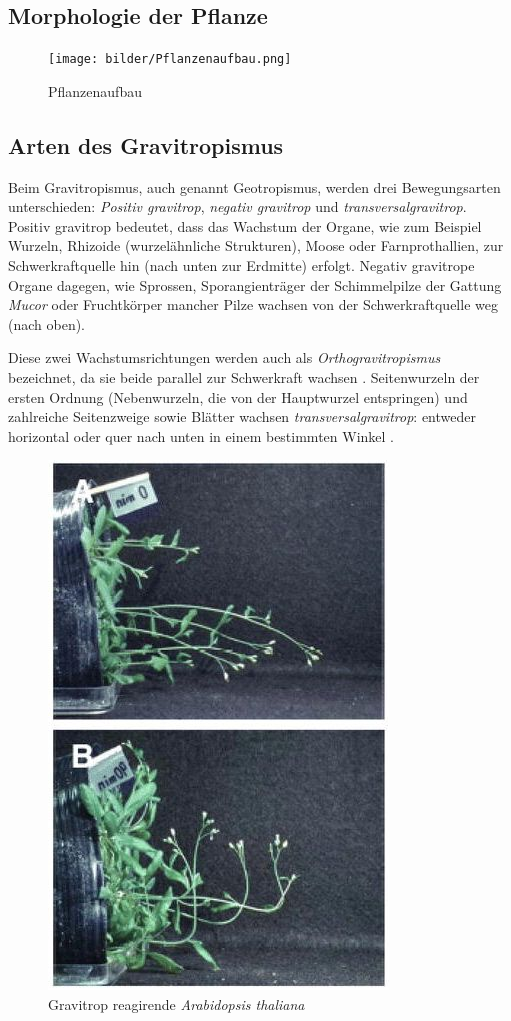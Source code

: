\documentclass[
a4paper, 
11pt, 
ngerman,
listof=totoc,
bibliography=totocnumbered,
abstracton
]{scrreprt}
\begin{document}
\subsection{Morphologie der Pflanze}

\begin{figure}[H]
	\centering 
	\texttt{[image: bilder/Pflanzenaufbau.png]}
	\caption{Pflanzenaufbau  \label{Pflanzenaufbau}}
\end{figure} 


\subsection{Arten des Gravitropismus}
Beim Gravitropismus, auch genannt Geotropismus, werden drei Bewegungsarten unterschieden: \emph{Positiv gravitrop},  \emph{negativ gravitrop} und  \emph{transversalgravitrop}.
Positiv gravitrop bedeutet, dass das Wachstum der Organe, wie zum Beispiel Wurzeln, Rhizoide (wurzelähnliche Strukturen), Moose oder Farnprothallien, zur Schwerkraftquelle hin (nach unten zur Erdmitte) erfolgt.
Negativ gravitrope Organe dagegen, wie Sprossen, Sporangienträger der Schimmelpilze der Gattung \emph{Mucor} oder Fruchtkörper mancher Pilze wachsen von der Schwerkraftquelle weg (nach oben).


Diese zwei Wachstumsrichtungen werden auch als \emph{Orthogravitropismus} bezeichnet, da sie beide parallel zur Schwerkraft wachsen \parencite[546]{Jacob}.
Seitenwurzeln der ersten Ordnung (Nebenwurzeln, die von der Hauptwurzel entspringen) und zahlreiche Seitenzweige sowie Blätter wachsen \emph{ transversalgravitrop}: entweder horizontal oder quer nach unten in einem bestimmten Winkel \parencite[449]{Strasburger}. 

\begin{figure}[H]
\centering 
 \includegraphics[width = 0.4\linewidth]{bilder/gravitrop_reagierende_Pflanze.jpg}
 \caption{Gravitrop reagirende \emph{Arabidopsis thaliana} \label{gravitrop_reagierende_Pflanze}}
\end{figure} 
 
\end{document}
